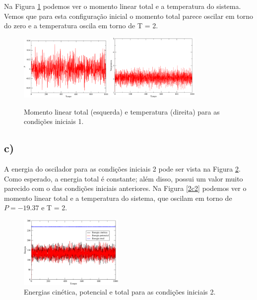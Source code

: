 \documentclass[a4wide]{report}
\begin{document}
Na Figura \ref{2b2} podemos ver o momento linear total e a temperatura do sistema. Vemos que para esta configuração inicial o momento total parece oscilar em torno do zero e a temperatura oscila em torno de T = 2.

\begin{figure}[!htb]
\centering
\includegraphics[width=0.4\textwidth]{P.pdf}
\includegraphics[width=0.4\textwidth]{temp.pdf}
\caption{Momento linear total (esquerda) e temperatura (direita) para as condições iniciais 1.}
\label{2b2}
\end{figure}


\subsection*{c)}

A energia do oscilador para as condições iniciais 2 pode ser vista na Figura \ref{2c1}. Como esperado, a energia total é constante; além disso, possui um valor muito parecido com o das condições iniciais anteriores. Na Figura \ref{2c2} podemos ver o momento linear total e a temperatura do sistema, que  oscilam em torno de $P = -19.37$ e T = 2.

\begin{figure}[!htb]
\centering
\includegraphics[width=0.447\textwidth]{energia2.pdf}
\caption{Energias cinética, potencial e total para as condições iniciais 2.}
\label{2c1}
\end{figure}
\end{document}
